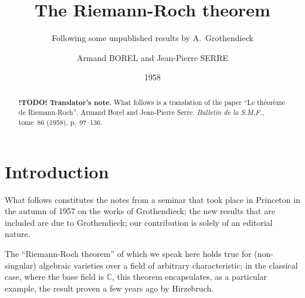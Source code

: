 \documentclass[10pt]{scrartcl}
\newcommand{\todo}{\textbf{ !TODO! }}
\begin{document}
\title{The Riemann-Roch theorem}
\subtitle{Following some unpublished results by A.~Grothendieck}
\author{Armand BOREL and Jean-Pierre SERRE}
\date{1958}
\maketitle

\begin{abstract}
\todo
\textbf{Translator's note.}
{What follows is a translation of the paper ``{Le théorème de Riemann-Roch}'', Armand Borel and Jean-Pierre Serre. \emph{Bulletin de la S.M.F.}, tome~86 (1958), p.~97--136}.

\end{abstract}



\section*{Introduction}
What follows constitutes the notes from a seminar that took place in Princeton in the autumn of 1957 on the works of Grothendieck;
the new results that are included are due to Grothendieck;
our contribution is solely of an editorial nature.

The ``Riemann-Roch theorem'' of which we speak here holds true for (non-singular) algebraic varieties over a field of arbitrary characteristic;
in the classical case, where the base field is $\mathbb{C}$, this theorem encapsulates, as a particular example, the result proven a few years ago by Hirzebruch.\cite{9}





\end{document}
